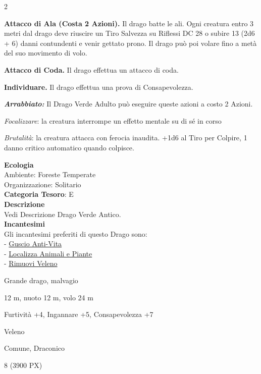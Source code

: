 \begin{multicols}{2}
{\textbf{Attacco di Ala (Costa 2 Azioni).} Il drago batte le ali. Ogni creatura entro 3 metri dal drago deve riuscire un Tiro Salvezza su Riflessi DC 28 o subire 13 (2d6 + 6) danni contundenti e venir gettato prono. Il drago può poi volare fino a metà del suo movimento di volo.

\textbf{Attacco di Coda.} Il drago effettua un attacco di coda.

\textbf{Individuare.} Il drago effettua una prova di Consapevolezza.

\emph{\textbf{Arrabbiato:}} Il Drago Verde Adulto può eseguire queste azioni a costo 2 Azioni.

\emph{Focalizzare}: la creatura interrompe un effetto mentale su di sé in corso

\emph{Brutalità}: la creatura attacca con ferocia inaudita. +1d6 al Tiro per Colpire, 1 danno critico automatico quando colpisce.

\textbf{Ecologia}\\
Ambiente: Foreste Temperate\\
Organizzazione: Solitario\\
\textbf{Categoria Tesoro}: E\\
\textbf{Descrizione}\\
Vedi Descrizione Drago Verde Antico.\\
\textbf{Incantesimi}\\
Gli incantesimi preferiti di questo Drago sono:\\
- \hyperlink{Guscio Anti-Vita}{Guscio Anti-Vita}\\
- \hyperlink{Localizza Animali e Piante}{Localizza Animali e Piante}\\
- \hyperlink{Rimuovi Veleno}{Rimuovi Veleno}

\begin{description}[noitemsep, topsep=0pt, parsep=0pt, partopsep=0pt, itemsep=1pt, leftmargin=2.35cm,  labelwidth=2.2cm, itemindent=0cm, listparindent=0pt] %
\setlength{\baselineskip}{10pt}
\item[\textbf{Taglia/Tipo}] Grande drago, malvagio
\item[\textbf{Caratt.}] 
\item[\textbf{Punti Ferita}] 
\item[\textbf{Movimento}] 12 m, nuoto 12 m, volo 24 m
\item[\textbf{Tiri Salvez.}] 
\item[\textbf{Comp.}] Furtività +4, Ingannare +5, Consapevolezza +7
\item[\textbf{Imm. Danni}] Veleno
\item[\textbf{Sensi}] 
\item[\textbf{Linguaggi}] Comune, Draconico
\item[\textbf{Sfida}] 8 (3900 PX)
\end{description}
\smallskip

}
\end{multicols}
